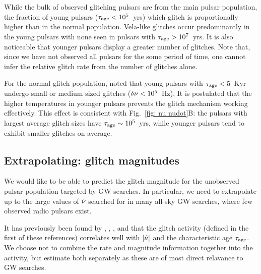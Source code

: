 \documentclass[../full_thesis/full_thesis.tex]{subfiles}
\begin{document}
While the bulk of observed glitching pulsars are from the main pulsar population, the
fraction of young pulsars ($\tau_{\mathrm{age}} < 10^{5}$~yrs) which glitch is proportionally
higher than in the normal population. Vela-like glitches occur predominantly
in the young pulsars with none seen in pulsars with $\tau_{\mathrm{age}} > 10^{7}$~yrs. It
is also noticeable that younger pulsars display a greater number of glitches. Note
that, since we have not observed all pulsars
for the some period of time, one cannot infer the relative glitch rate from the
number of glitches alone.


For the normal-glitch population, \citet{Espinoza2011} noted that young pulsars
with $\tau_{\mathrm{age}} < 5 $~Kyr undergo small or medium sized glitches ($\delta\nu < 10^{5}$~Hz).
It is postulated that the higher temperatures in younger pulsars prevents
the glitch mechanism working effectively. This effect is consistent with
Fig.~\ref{fig: nu nudot}B: the pulsars with largest average glitch sizes have
$\tau_{\mathrm{age}} \sim 10^{5}$~yrs, while younger pulsars tend to exhibit smaller glitches
on average.

\subsection{Extrapolating: glitch magnitudes}

We would like to be able to predict the glitch magnitude for the unobserved
pulsar population targeted by GW searches. In particular, we need to
extrapolate up to the large values of $\dot{\nu}$ searched for in many all-sky
GW searches, where few observed radio pulsars exist.

It has previously been found by \citet{Mckenna1990}, \citet{Lyne2000},
\citet{Wang2000}, and \citet{Espinoza2011}
that the glitch activity (defined in the first of these references) correlates
well with $|\dot{\nu}|$ and the characteristic age
$\tau_{\mathrm{age}}$. We choose not to combine the rate and
magnitude information together into the activity, but estimate both separately
as these are of most direct relavance to GW searches.
\end{document}
